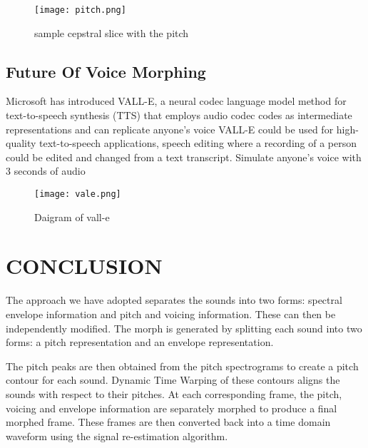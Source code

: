 \documentclass[12pt]{report}
\begin{document}
\begin{figure}[h!]
\begin{center}
  \texttt{[image: pitch.png]}
  \caption{sample cepstral slice with the pitch }
  \label{fig:is}
\end{center}
\end{figure}
\section{ Future Of Voice Morphing }
Microsoft has introduced VALL-E, a neural codec language model method for text-to-speech synthesis (TTS) that employs audio codec codes as intermediate representations and can replicate anyone's voice
VALL-E could be used for high-quality text-to-speech applications, speech editing where a recording of a person could be edited and changed from a text transcript.
Simulate anyone’s voice with 3 seconds of audio

\begin{figure}[h!]
\begin{center}
  \texttt{[image: vale.png]}
  \caption{Daigram of vall-e }
  \label{fig:is}
\end{center}
\end{figure}

\chapter{CONCLUSION}
The approach we have adopted separates the sounds into two forms: spectral envelope information and pitch and voicing information. These can then be independently modified. The morph is generated by splitting each sound into two forms: a pitch representation and an envelope representation.
\newline

 The pitch peaks are then obtained from the pitch spectrograms to create a pitch contour for each sound. Dynamic Time Warping of these contours aligns the sounds with respect to their pitches. At each corresponding frame, the pitch, voicing and envelope information are separately morphed to produce a final morphed frame. These frames are then converted back into a time domain waveform using the signal re-estimation algorithm.
\newline
\end{document}
